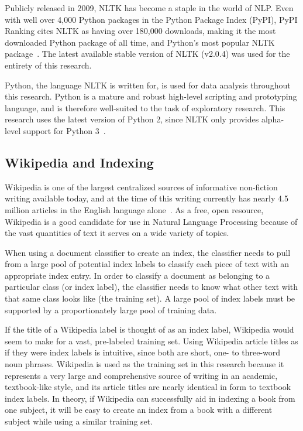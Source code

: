 Publicly released in 2009, NLTK has become a staple in the world of NLP.
Even with well over 4,000 Python packages in the Python Package Index (PyPI), PyPI Ranking cites NLTK as having over 180,000 downloads, making it the  most downloaded Python package of all time, and Python's most popular NLTK package~\cite{pypi-ranking}.
The latest available stable version of NLTK (v2.0.4) was used for the entirety of this research.

Python, the language NLTK is written for, is used for data analysis throughout this research.
Python is a mature and robust high-level scripting and prototyping language, and is therefore well-suited to the task of exploratory research.
This research uses the latest version of Python 2, since NLTK only provides alpha-level support for Python 3~\cite{nltk-install}.

\subsection{Wikipedia and Indexing}

Wikipedia is one of the largest centralized sources of informative non-fiction writing available today, and at the time of this writing currently has nearly 4.5 million articles in the English language alone~\cite{wikipedia}.
As a free, open resource, Wikipedia is a good candidate for use in Natural Language Processing because of the vast quantities of text it serves on a wide variety of topics.

When using a document classifier to create an index, the classifier needs to pull from a large pool of potential index labels to classify each piece of text with an appropriate index entry.
In order to classify a document as belonging to a particular class (or index label), the classifier needs to know what other text with that same class looks like (the training set).
A large pool of index labels must be supported by a proportionately large pool of training data.

If the title of a Wikipedia label is thought of as an index label, Wikipedia would seem to make for a vast, pre-labeled training set.
Using Wikipedia article titles as if they were index labels is intuitive, since both are short, one- to three-word noun phrases.
Wikipedia is used as the training set in this research because it represents a very large and comprehensive source of writing in an academic, textbook-like style, and its article titles are nearly identical in form to textbook index labels.
In theory, if Wikipedia can successfully aid in indexing a book from one subject, it will be easy to create an index from a book with a different subject while using a similar training set.
